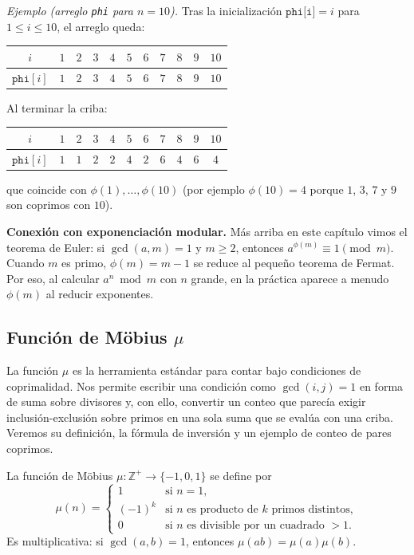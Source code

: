 \textit{Ejemplo (arreglo \texttt{phi} para $n=10$).} Tras la inicialización $\texttt{phi[i]}=i$ para $1\le i\le 10$, el arreglo queda:
\begin{center}
\small
\begin{tabular}{|c|c|c|c|c|c|c|c|c|c|c|}
\hline
$i$ & $1$ & $2$ & $3$ & $4$ & $5$ & $6$ & $7$ & $8$ & $9$ & $10$ \\
\hline
$\texttt{phi}[i]$ & $1$ & $2$ & $3$ & $4$ & $5$ & $6$ & $7$ & $8$ & $9$ & $10$ \\
\hline
\end{tabular}
\end{center}

Al terminar la criba:
\begin{center}
\small
\begin{tabular}{|c|c|c|c|c|c|c|c|c|c|c|}
\hline
$i$ & $1$ & $2$ & $3$ & $4$ & $5$ & $6$ & $7$ & $8$ & $9$ & $10$ \\
\hline
$\texttt{phi}[i]$ & $1$ & $1$ & $2$ & $2$ & $4$ & $2$ & $6$ & $4$ & $6$ & $4$ \\
\hline
\end{tabular}
\end{center}
que coincide con $\phi(1),\ldots,\phi(10)$ (por ejemplo $\phi(10)=4$ porque $1$, $3$, $7$ y $9$ son coprimos con $10$).

\textbf{Conexión con exponenciación modular.} Más arriba en este capítulo vimos el teorema de Euler: si $\gcd(a,m)=1$ y $m \ge 2$, entonces $a^{\phi(m)} \equiv 1 \pmod{m}$. Cuando $m$ es primo, $\phi(m)=m-1$ se reduce al pequeño teorema de Fermat. Por eso, al calcular $a^n \bmod m$ con $n$ grande, en la práctica aparece a menudo $\phi(m)$ al reducir exponentes.

\subsection*{Función de Möbius $\mu$}

La función $\mu$ es la herramienta estándar para contar bajo condiciones de coprimalidad. Nos permite escribir una condición como $\gcd(i,j)=1$ en forma de suma sobre divisores y, con ello, convertir un conteo que parecía exigir inclusión-exclusión sobre primos en una sola suma que se evalúa con una criba. Veremos su definición, la fórmula de inversión y un ejemplo de conteo de pares coprimos.

La función de Möbius $\mu:\mathbb{Z}^+\to\{-1,0,1\}$ se define por
\[
\mu(n) = \begin{cases}
1 & \text{si } n = 1, \\
(-1)^k & \text{si } n \text{ es producto de } k \text{ primos distintos}, \\
0 & \text{si } n \text{ es divisible por un cuadrado } > 1.
\end{cases}
\]
Es multiplicativa: si $\gcd(a,b)=1$, entonces $\mu(ab)=\mu(a)\mu(b)$.

